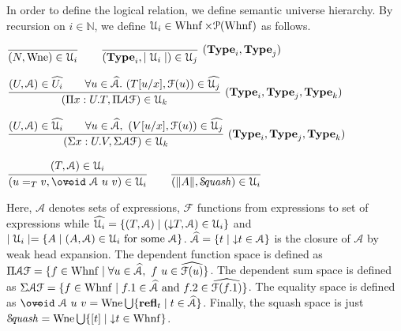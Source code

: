 \documentclass[a4paper,english]{lipics-utf8x}
\begin{document}

  In order to define the logical relation, we define semantic universe hierarchy.
  By recursion on $i \in \mathbb{N}$, we define
  $\mathcal{U}_i \in \operatorname{Whnf} \times \mathcal{P}(\operatorname{Whnf})$ as follows.

  \begin{center}
  \(
    \ru{}{(N, \Wne) \in \U_i}
    \qquad
    \rux{}{(\Type_i, \mid \U_i \mid) \in \U_j}{(\Type_i,\Type_j)}
  \)
  \end{center}

  \begin{center}
  \(
    \rux{(U, \mathcal{A}) \in \widehat{U_i} \qquad
         \forall u \in \widehat{\mathcal{A}}.\ (T[u/x],\mathcal{F}(u)) \in
         \widehat{\U_j}
       }{(\Pi x:U.T, \Pi \mathcal{A} \mathcal{F}) \in \U_k
       }{(\Type_i, \Type_j, \Type_k)}
  \)
  \end{center}

  \begin{center}
  \(
    \rux{(U, \mathcal{A}) \in \widehat{\U_i} \qquad
        \forall u \in \widehat{\mathcal{A}},\ (V[u/x], \mathcal{F}(u)) \in
        \widehat{\U_j}
       }{(\Sigma x:U.V, \Sigma \mathcal{A} \mathcal{F}) \in \U_k
       }{(\Type_i, \Type_j, \Type_k)}
  \)
  \end{center}

  \begin{center}
  \(
    \ru{(T,\mathcal{A}) \in \U_i
      }{(u =_T v, \oeq\ \mathcal{A}\ u\ v) \in \U_i}
    \qquad
    \ru{}{(\squash{A}, \Squash) \in \U_i}
  \)
  \end{center}

  \noindent %
  Here, $\mathcal{A}$ denotes sets of expressions, $\mathcal{F}$ functions from
  expressions to set of expressions while
  $\widehat{\mathcal{U}_i} = \{ (T,\mathcal{A}) \mid ({\downarrow} T, \mathcal{A}) \in \mathcal{U}_i \}$
  and $\mid \mathcal{U}_i \mid = \{ A \mid (A, \mathcal{A}) \in \mathcal{U}_i \text{ for some }
  \mathcal{A} \}$.
  $\widehat{\mathcal{A}} = \{ t \mid {\downarrow} t \in \mathcal{A} \}$ is the closure
  of $\mathcal{A}$ by weak head expansion.
  The dependent function space is defined as
  $\Pi \mathcal{A} \mathcal{F} = \{ f \in \operatorname{Whnf} \mid \forall u \in
  \widehat{\mathcal{A}},\ f~u \in \widehat{\mathcal{F}(u)} \}$.
  The dependent sum space is defined as
  $\Sigma \mathcal{A} \mathcal{F} = \{ f \in \operatorname{Whnf} \mid f.1 \in
  \widehat{\mathcal{A}} \text{ and } f.2 \in \widehat{\mathcal{F}(f.1)} \}$.
  The equality space is defined as
  $\oeq\ \mathcal{A}\ u\ v = \Wne \bigcup \{ \refl_t \mid t \in
  \widehat{\mathcal{A}} \}$.
  Finally, the squash space is just
  $\operatorname{\mathcal{S}\!\mathit{quash}} = \operatorname{Wne} \bigcup \{ [t] \mid {\downarrow} t \in \operatorname{Whnf} \}$.
\end{document}
